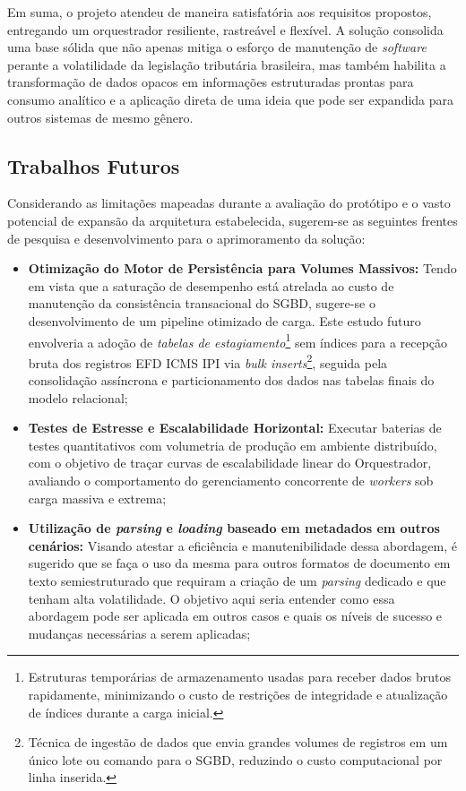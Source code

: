 Em suma, o projeto atendeu de maneira satisfatória aos requisitos propostos,
entregando um orquestrador resiliente, rastreável e flexível. A solução
consolida uma base sólida que não apenas mitiga o esforço de manutenção de
\textit{software} perante a volatilidade da legislação tributária brasileira,
mas também habilita a transformação de dados opacos em informações estruturadas
prontas para consumo analítico e a aplicação direta de uma ideia que pode ser
expandida para outros sistemas de mesmo gênero.

\subsection{Trabalhos Futuros}
\label{sec:trabalhos_futuros}

Considerando as limitações mapeadas durante a avaliação do protótipo e o vasto
potencial de expansão da arquitetura estabelecida, sugerem-se as seguintes
frentes de pesquisa e desenvolvimento para o aprimoramento da solução:

\begin{itemize}
    \item \textbf{Otimização do Motor de Persistência para Volumes Massivos:}
    Tendo em vista que a saturação de desempenho está atrelada ao custo de
    manutenção da consistência transacional do SGBD, sugere-se o desenvolvimento
    de um pipeline otimizado de carga. Este estudo futuro envolveria a adoção de
    \textit{tabelas de estagiamento}\footnote{Estruturas temporárias de
    armazenamento usadas para receber dados brutos
    rapidamente, minimizando o custo de restrições de integridade e atualização
    de índices durante a carga inicial.} sem índices para a
    recepção bruta dos registros EFD ICMS IPI via
    \textit{bulk inserts}\footnote{Técnica de ingestão de dados que envia
    grandes volumes de registros em um único lote ou comando para o SGBD,
    reduzindo o custo computacional por linha inserida.},
    seguida pela consolidação assíncrona e particionamento dos dados nas
    tabelas finais do modelo relacional;

    \item \textbf{Testes de Estresse e Escalabilidade Horizontal:} Executar
    baterias de testes quantitativos com volumetria de produção em ambiente
    distribuído, com o objetivo de traçar curvas de escalabilidade linear
    do Orquestrador, avaliando o comportamento do gerenciamento concorrente
    de \textit{workers} sob carga massiva e extrema;

    \item \textbf{Utilização de \textit{parsing} e \textit{loading} baseado
    em metadados em outros cenários:} Visando atestar a eficiência e
    manutenibilidade dessa abordagem, é sugerido que se faça o uso da
    mesma para outros formatos de documento em texto semiestruturado que
    requiram a criação de um \textit{parsing} dedicado e que tenham alta
    volatilidade. O objetivo aqui seria entender como essa abordagem pode ser
    aplicada em outros casos e quais os níveis de sucesso e mudanças necessárias
    a serem aplicadas;
\end{itemize}